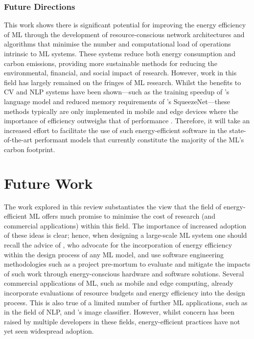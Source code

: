 \documentclass[a4paper, 12pt]{article}
\begin{document}
    \subsubsection{Future Directions}

    This work shows there is significant potential for improving the energy efficiency of ML through the development of resource-conscious network architectures and algorithms that minimise the number and computational load of operations intrinsic to ML systems. These systems reduce both energy consumption and carbon emissions, providing more sustainable methods for reducing the environmental, financial, and social impact of research. However, work in this field has largely remained on the fringes of ML research. Whilst the benefits to CV and NLP systems have been shown---such as the training speedup of 's language model and reduced memory requirements of 's SqueezeNet---these methods typically are only implemented in mobile and edge devices where the importance of efficiency outweighs that of performance \cite{kumar-2020}. Therefore, it will take an increased effort to facilitate the use of such energy-efficient software in the state-of-the-art performant models that currently constitute the majority of the ML's carbon footprint.


    \section{Future Work}

    The work explored in this review substantiates the view that the field of energy-efficient ML offers much promise to minimise the cost of research (and commercial applications) within this field. The importance of increased adoption of these ideas is clear; hence, when designing a large-scale ML system one should recall the advice of , who advocate for the incorporation of energy efficiency within the design process of any ML model, and use software engineering methodologies such as a project pre-mortum \cite{klein-2008} to evaluate and mitigate the impacts of such work through energy-conscious hardware and software solutions. Several commercial applications of ML, such as mobile and edge computing, already incorporate evaluations of resource budgets and energy efficiency into the design process. This is also true of a limited number of further ML applications, such as  in the field of NLP, and 's image classifier. However, whilst concern has been raised by multiple developers in these fields, energy-efficient practices have not yet seen widespread adoption.
\end{document}
